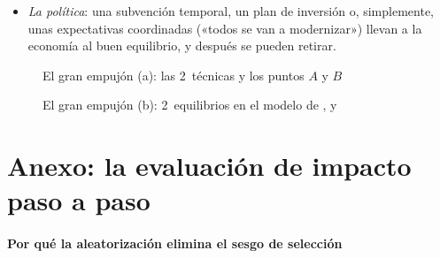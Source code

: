 \documentclass[11pt]{article}
\begin{document}
\begin{itemize}
\begin{itemize}
  \item \emph{los salarios} (gráfico~\ref{fig:gran-empujon}): los costes de la empresa moderna se leen en las rectas de costes, $q=w\,L_j$, de pendiente $w$: sobre ellas el beneficio es nulo. Con $w_2$ la recta pasa entre $A$ y $B$: la empresa sola pierde y todas juntas ganan, y hace falta el gran empujón. Con un salario bajo ($w_1$) a la empresa le compensa modernizarse sola; con uno alto ($w_3$), ni siquiera todas juntas.
  \end{itemize}
\item \emph{La política}: una subvención temporal, un plan de inversión o, simplemente, unas expectativas coordinadas («todos se van a modernizar») llevan a la economía al buen equilibrio, y después se pueden retirar.
\end{itemize}

\begin{figure}[H]
\centering
\caption{El gran empujón (a): las 2~técnicas y los puntos $A$ y $B$}\label{fig:gran-empujon-a}
\end{figure}

\begin{figure}[H]
\centering
\caption{El gran empujón (b): 2~equilibrios en el modelo de ,  y }\label{fig:gran-empujon}
\end{figure}

\section{Anexo: la evaluación de impacto paso a paso}\label{anexo:evaluacion}

\paragraph{Por qué la aleatorización elimina el sesgo de selección}
\end{document}
